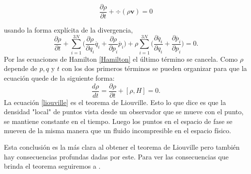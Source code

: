 \begin{equation} \label{con}
 \frac{\partial \rho}{\partial t} + \div{ ( \rho\mathbf{v} ) }=0
\end{equation}

usando la forma explícita de la divergencia,
\begin{equation}
 \frac{\partial \rho}{\partial t} +\sum_{i=1}^{3N} \Big( \frac{\partial\rho}{\partial q_{i}}\dot{q_{i}}+  \frac{\partial\rho}{\partial p_{i}}\dot{p_{i}} \Big) + \rho \sum_{i=1}^{3N} \Big( \frac{\partial \dot{q_{i}}}{\partial q_{i}} + \frac{\partial \dot{p_{i}}}{\partial p_{i}}\Big)=0.
\end{equation}
Por las ecuaciones de Hamilton \ref{Hamilton} el último término se cancela. Como $\rho$ depende de $p,q$ y $t$ con los dos primeros términos se pueden organizar para que la ecuación quede de la siguiente forma:
\begin{equation} \label{liouville}
\frac{d \rho}{dt}= \frac{\partial \rho}{\partial t} + [ \rho, H ]=0.
\end{equation}
La ecuación \ref{liouville} es el teorema de Liouville. Esto lo que dice es que la densidad "local" de puntos vista desde un observador que se mueve con el punto, se mantiene constante en el tiempo. Luego los puntos en el espacio de fase se mueven de la misma manera que un fluido incompresible en el espacio físico.

Esta conclusión es la más clara al obtener el teorema de Liouville pero también hay consecuencias profundas dadas por este. Para ver las consecuencias que brinda el teorema seguiremos a \cite{KardarStat}.

